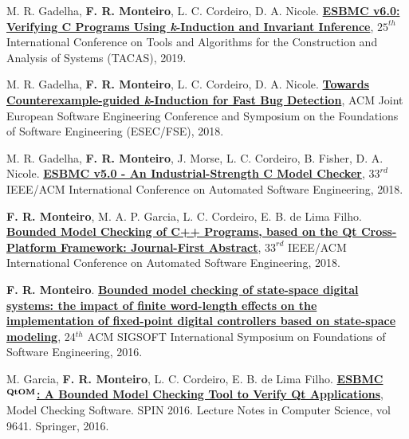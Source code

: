 \documentclass[letterpaper]{article}
\renewenvironment{itemize}{
  \begin{list}{}{
    \setlength{\leftmargin}{1.5em}
  }
}{
  \end{list}
}
\begin{document}
\begin{itemize}
        \item M. R. Gadelha, {\bf F. R. Monteiro}, L. C. Cordeiro, D. A. Nicole. \href{https://link.springer.com/chapter/10.1007/978-3-030-17502-3_15}{{\bf ESBMC v6.0: Verifying C Programs Using {\emph k}-Induction and Invariant Inference}},
   $25^{th}$ International Conference on Tools and Algorithms for the Construction and Analysis of Systems (TACAS), 2019.
   
    \item M. R. Gadelha, {\bf F. R. Monteiro}, L. C. Cordeiro, D. A. Nicole. \href{https://ssvlab.github.io/lucasccordeiro/papers/fse2018.pdf}{{\bf Towards Counterexample-guided {\emph k}-Induction for Fast Bug Detection}},
   ACM Joint European Software Engineering Conference and Symposium on the Foundations of Software Engineering (ESEC/FSE), 2018.
  
    \item M. R. Gadelha, {\bf F. R. Monteiro}, J. Morse, L. C. Cordeiro, B. Fisher, D. A. Nicole. \href{https://ssvlab.github.io/lucasccordeiro/papers/ase2018.pdf}{{\bf ESBMC v5.0 - An Industrial-Strength C Model Checker}},
  $33^{rd}$ IEEE/ACM International Conference on Automated Software Engineering, 2018.  
        
    \item {\bf F. R. Monteiro}, M. A. P. Garcia, L. C. Cordeiro, E. B. de Lima Filho. \href{https://www.researchgate.net/publication/326657978_Bounded_Model_Checking_of_C_Programs_based_on_the_Qt_Cross-Platform_Framework_Journal-First_Abstract}{{\bf Bounded Model Checking of C++ Programs, based on the Qt Cross-Platform Framework: Journal-First Abstract}},
  $33^{rd}$ IEEE/ACM International Conference on Automated Software Engineering, 2018.  
  
    \item {\bf F. R. Monteiro}. \href{http://dl.acm.org/citation.cfm?id=2983979}{{\bf Bounded model checking of state-space digital systems: the impact of finite word-length effects on the implementation of fixed-point digital controllers based on state-space modeling}},
  24$^{th}$ ACM SIGSOFT International Symposium on Foundations of Software Engineering, 2016.
  
  \item M. Garcia, {\bf F. R. Monteiro}, L. C. Cordeiro, E. B. de Lima Filho. \href{http://link.springer.com/chapter/10.1007/978-3-319-32582-8_6}{{\bf ESBMC$^{\bf QtOM}$: A Bounded Model Checking Tool to Verify Qt Applications}},
  Model Checking Software. SPIN 2016. Lecture Notes in Computer Science, vol 9641. Springer, 2016.


\end{itemize}
\end{document}
